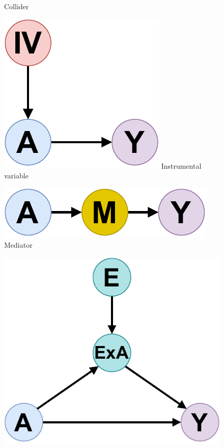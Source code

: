 \documentclass[10pt,letterpaper]{article}
\begin{document}
\begin{figure}[h!]
\begin{minipage}[t]{0.32\linewidth}
        \small\sffamily Collider
    \end{minipage}
    \hfill
    \begin{minipage}[t]{0.32\linewidth}
        \centering
        \includegraphics[width=0.72\linewidth]{img_supp_final/instrumental_variable.pdf}
        \small\sffamily Instrumental \\variable
    \end{minipage}
    \vfill
    \begin{minipage}[t]{0.4\linewidth}
        \centering
        \includegraphics[width=.9\linewidth]{img_supp_final/mediator.pdf}%
        \\
        \small\sffamily Mediator
    \end{minipage}
    \hfill
    \begin{minipage}[t]{0.4\linewidth}
        \centering
        \includegraphics[width=\linewidth]{img_supp_final/effect_modifier.pdf}%

\end{minipage}
\end{figure}
\end{document}
